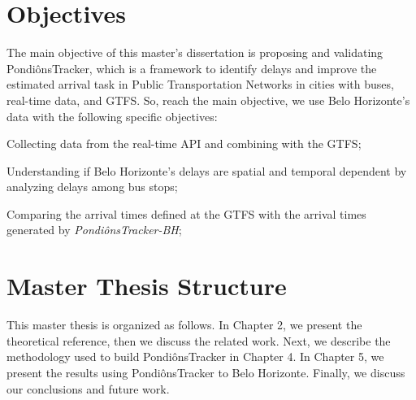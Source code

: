 \section{Objectives}
The main objective of this master's dissertation is 
proposing and validating PondiônsTracker, which is a framework to identify delays
and improve the estimated arrival task
in Public Transportation Networks in cities with buses, real-time data, and GTFS. So, 
reach the main objective, we use Belo Horizonte's data with the following specific objectives:
\begin{enumerate*}
    \item Collecting data from the real-time API and combining with the GTFS;
    \item Understanding if Belo Horizonte's delays are spatial and temporal dependent by analyzing delays among bus stops;
    \item Comparing the arrival times defined at the GTFS with the arrival times generated by \textit{PondiônsTracker-BH};
\end{enumerate*}

\section{Master Thesis Structure}
This master thesis is organized as follows. In Chapter 2, we present the 
theoretical reference, then we discuss the related work. Next, 
we describe the methodology used to build PondiônsTracker in Chapter 4.
In Chapter 5, we present the results using PondiônsTracker to Belo Horizonte.
Finally, we discuss our conclusions and future work.
